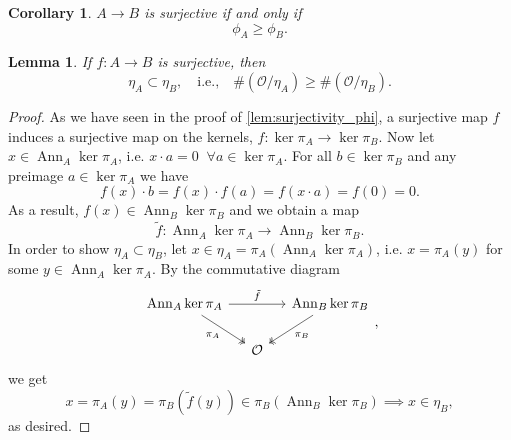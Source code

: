 \documentclass{article}
\theoremstyle{plain}%
\newtheorem{lemma}{Lemma}[section]
\newtheorem{corollary}{Corollary}[section]
\theoremstyle{definition}
\theoremstyle{remark}
\newcommand{\ann}{\operatorname{Ann}}
\begin{document}
    \begin{corollary}\label{cor:surjectivity_phi}
        \(A \to B\) is surjective if and only if \[\phi_A \geq \phi_B.\]
    \end{corollary}

    \begin{lemma}
        If \(f \colon A \to B\) is surjective, then
        \begin{equation}
            \eta_A \subset \eta_B, \quad \text{i.e.,}\quad \#(\mathcal{O}/\eta_A) \geq \#(\mathcal{O}/\eta_B).  
        \end{equation}
    \end{lemma}
    \begin{proof}
        As we have seen in the proof of \cref{lem:surjectivity_phi}, a surjective map \(f\) induces a surjective
        map on the kernels, \(f\colon \ker \pi_A \to \ker\pi_B\).
        Now let \(x \in \ann_A \ker \pi_A\), i.e. \(x \cdot a = 0\;\; \forall a \in \ker \pi_A\).
        For all \(b \in \ker \pi_B\) and any preimage \(a \in \ker \pi_A\) we have
        \[
            f(x) \cdot b = f(x) \cdot f(a) = f(x \cdot a) = f(0) = 0.
        \]
        As a result, \(f(x) \in \ann_B\ker \pi_B\) and we obtain a map
        \[
            \tilde f\colon\ann_A\ker \pi_A \to \ann_B \ker \pi_B.  
        \]
        In order to show \(\eta_A \subset \eta_B\), let \(x \in \eta_A = \pi_A(\ann_A \ker \pi_A)\), i.e.
        \(x = \pi_A(y)\) for some \(y \in \ann_A \ker \pi_A\). By the commutative diagram
        \[
        \begin{tikzcd}[column sep=small]
            \ann_A \ker \pi_A \arrow[rr, "\tilde f"] \arrow [dr, "\pi_A", swap, twoheadrightarrow] 
            & & \ann_B \ker \pi_B \arrow [dl, "\pi_B", twoheadrightarrow]\\
            & \mathcal{O} &
        \end{tikzcd},
        \]
        we get
        \[
            x = \pi_A(y) = \pi_B(\tilde f(y)) \in \pi_B(\ann_B \ker \pi_B) \implies x \in \eta_B,
        \]
        as desired.
    \end{proof}
\end{document}
